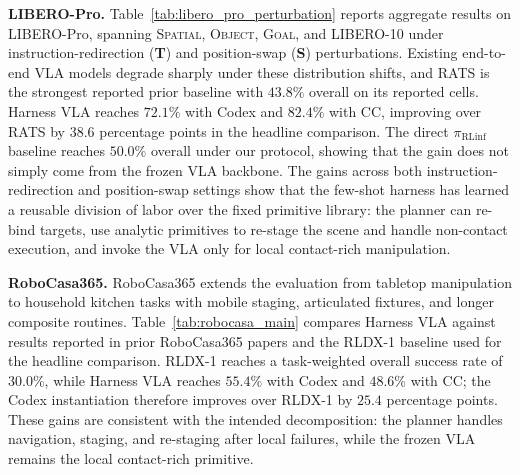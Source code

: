 \documentclass[11pt]{article}
\newcommand{\piRLinf}{\pi_{\mathrm{RLinf}}}
\begin{document}
\textbf{LIBERO-Pro.} Table~\ref{tab:libero_pro_perturbation} reports aggregate results on LIBERO-Pro, spanning \textsc{Spatial}, \textsc{Object}, \textsc{Goal}, and \textsc{LIBERO-10} under instruction-redirection (\textbf{T}) and position-swap (\textbf{S}) perturbations. Existing end-to-end VLA models degrade sharply under these distribution shifts, and RATS is the strongest reported prior baseline with $43.8\%$ overall on its reported cells. Harness VLA reaches $72.1\%$ with Codex and $82.4\%$ with CC, improving over RATS by $38.6$ percentage points in the headline comparison. The direct $\piRLinf$ baseline reaches $50.0\%$ overall under our protocol, showing that the gain does not simply come from the frozen VLA backbone. The gains across both instruction-redirection and position-swap settings show that the few-shot harness has learned a reusable division of labor over the fixed primitive library: the planner can re-bind targets, use analytic primitives to re-stage the scene and handle non-contact execution, and invoke the VLA only for local contact-rich manipulation.


\textbf{RoboCasa365.} RoboCasa365 extends the evaluation from tabletop manipulation to household kitchen tasks with mobile staging, articulated fixtures, and longer composite routines. Table~\ref{tab:robocasa_main} compares Harness VLA against results reported in prior RoboCasa365 papers and the RLDX-1 baseline used for the headline comparison. RLDX-1 reaches a task-weighted overall success rate of $30.0\%$, while Harness VLA reaches $55.4\%$ with Codex and $48.6\%$ with CC; the Codex instantiation therefore improves over RLDX-1 by $25.4$ percentage points. These gains are consistent with the intended decomposition: the planner handles navigation, staging, and re-staging after local failures, while the frozen VLA remains the local contact-rich primitive.
\end{document}
